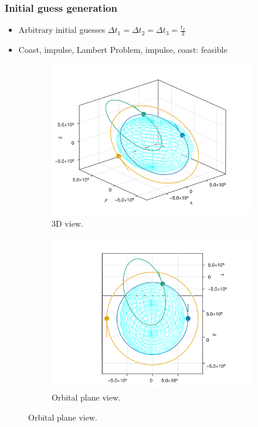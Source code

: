 \documentclass{beamer}
\begin{document}
\begin{frame}
    \frametitle{Initial guess generation}
    \begin{itemize}\pause
        \item Arbitrary initial guesses \(\Delta t_1 = \Delta t_2 = \Delta t_3 = \frac{t_f}{3}\)\pause
        \item Coast, impulse, Lambert Problem, impulse, coast: feasible
    \end{itemize}
    
    \begin{figure}[htbp]
        \centering
        \begin{subfigure}{0.49\textwidth}
            \includegraphics[width=\textwidth]{../report/img/hohmann_lambert_guess.png}
            \caption{3D view.}
        \end{subfigure}
        \begin{subfigure}{0.49\textwidth}
            \includegraphics[width=\textwidth]{../report/img/hohmann_lambert_guess_in_plane.png}
            \caption{Orbital plane view.}
        \end{subfigure}
        \label{fig:hohmann_lambert}
    \end{figure}

\end{frame}
\end{document}
